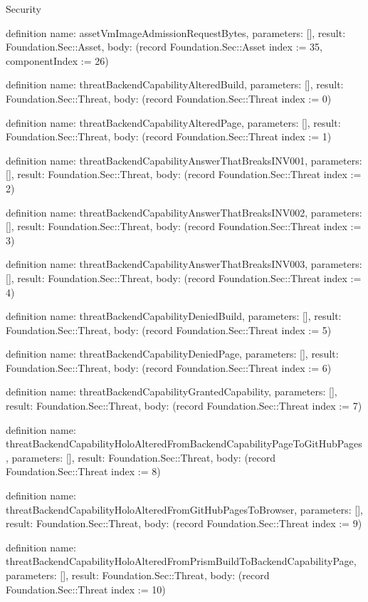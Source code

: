 \begin{lexlean}{Security}
\begin{semanticmodule}
definition{
  name: assetVmImageAdmissionRequestBytes,
  parameters: [],
  result: Foundation.Sec::Asset,
  body: (record Foundation.Sec::Asset {index := 35, componentIndex := 26})
}

definition{
  name: threatBackendCapabilityAlteredBuild,
  parameters: [],
  result: Foundation.Sec::Threat,
  body: (record Foundation.Sec::Threat {index := 0})
}

definition{
  name: threatBackendCapabilityAlteredPage,
  parameters: [],
  result: Foundation.Sec::Threat,
  body: (record Foundation.Sec::Threat {index := 1})
}

definition{
  name: threatBackendCapabilityAnswerThatBreaksINV001,
  parameters: [],
  result: Foundation.Sec::Threat,
  body: (record Foundation.Sec::Threat {index := 2})
}

definition{
  name: threatBackendCapabilityAnswerThatBreaksINV002,
  parameters: [],
  result: Foundation.Sec::Threat,
  body: (record Foundation.Sec::Threat {index := 3})
}

definition{
  name: threatBackendCapabilityAnswerThatBreaksINV003,
  parameters: [],
  result: Foundation.Sec::Threat,
  body: (record Foundation.Sec::Threat {index := 4})
}

definition{
  name: threatBackendCapabilityDeniedBuild,
  parameters: [],
  result: Foundation.Sec::Threat,
  body: (record Foundation.Sec::Threat {index := 5})
}

definition{
  name: threatBackendCapabilityDeniedPage,
  parameters: [],
  result: Foundation.Sec::Threat,
  body: (record Foundation.Sec::Threat {index := 6})
}

definition{
  name: threatBackendCapabilityGrantedCapability,
  parameters: [],
  result: Foundation.Sec::Threat,
  body: (record Foundation.Sec::Threat {index := 7})
}

definition{
  name: threatBackendCapabilityHoloAlteredFromBackendCapabilityPageToGitHubPages,
  parameters: [],
  result: Foundation.Sec::Threat,
  body: (record Foundation.Sec::Threat {index := 8})
}

definition{
  name: threatBackendCapabilityHoloAlteredFromGitHubPagesToBrowser,
  parameters: [],
  result: Foundation.Sec::Threat,
  body: (record Foundation.Sec::Threat {index := 9})
}

definition{
  name: threatBackendCapabilityHoloAlteredFromPrismBuildToBackendCapabilityPage,
  parameters: [],
  result: Foundation.Sec::Threat,
  body: (record Foundation.Sec::Threat {index := 10})
}


\end{semanticmodule}
\end{lexlean}
